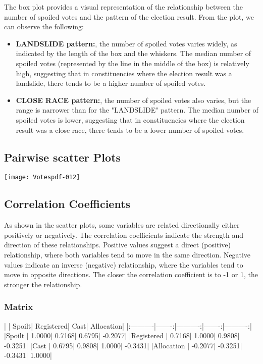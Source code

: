 \documentclass[fleqn,a4paper,12pt]{article}
\begin{document}
The box plot provides a visual representation of the relationship between the number of spoiled votes and the pattern of the election result.
From the plot, we can observe the following:
\begin{itemize}
\item \textbf{LANDSLIDE pattern:}, the number of spoiled votes varies widely, as indicated by the length of the box and the whiskers. The median number of spoiled votes (represented by the line in the middle of the box) is relatively high, suggesting that in constituencies where the election result was a landslide, there tends to be a higher number of spoiled votes.
\item \textbf{CLOSE RACE pattern:}, the number of spoiled votes also varies, but the range is narrower than for the "LANDSLIDE" pattern. The median number of spoiled votes is lower, suggesting that in constituencies where the election result was a close race, there tends to be a lower number of spoiled votes.
\end{itemize}
 

\subsection{Pairwise scatter Plots}

\texttt{[image: Votespdf-012]}

\subsection{Correlation Coefficients}

As shown in the scatter plots, some variables are related directionally either positively or negatively. The correlation coefficients indicate the strength and direction of these relationships. Positive values suggest a direct (positive) relationship, where both variables tend to move in the same direction. Negative values indicate an inverse (negative) relationship, where the variables tend to move in opposite directions. The closer the correlation coefficient is to -1 or 1, the stronger the relationship.

\subsubsection{Matrix}
\begin{Schunk}
\begin{Soutput}
|           |  Spoilt| Registered|    Cast| Allocation|
|:----------|-------:|----------:|-------:|----------:|
|Spoilt     |  1.0000|     0.7168|  0.6795|    -0.2077|
|Registered |  0.7168|     1.0000|  0.9808|    -0.3251|
|Cast       |  0.6795|     0.9808|  1.0000|    -0.3431|
|Allocation | -0.2077|    -0.3251| -0.3431|     1.0000|
\end{Soutput}
\end{Schunk}
\end{document}
